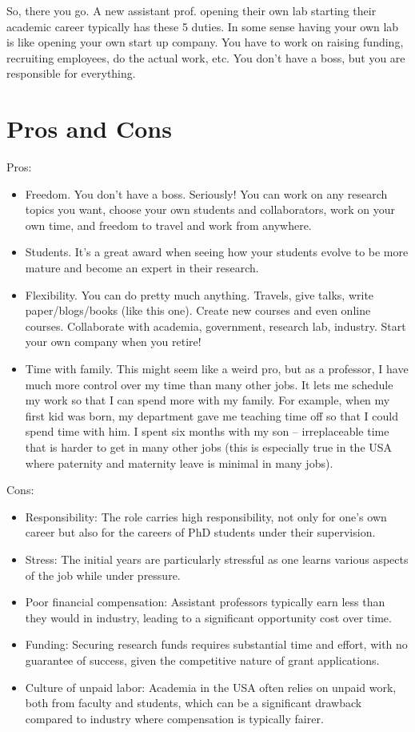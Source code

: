 \documentclass[oneside,11pt]{memoir}
\begin{document}
So, there you go. A new assistant prof. opening their own lab starting their academic career typically has these 5 duties.  In some sense having your own lab is like opening your own start up company. You have to work on raising funding, recruiting employees, do the actual work, etc.  You don't have a boss, but you are responsible for everything.  


\section{Pros and Cons}

Pros:
\begin{itemize}
\item Freedom. You don’t have a boss. Seriously! You can work on any research topics you want, choose your own students and collaborators, work on your own time, and freedom to travel and work from anywhere.

  \item Students. It's a great award when seeing how your students evolve to be more mature and become an expert in their research.

\item Flexibility. You can do pretty much anything.  Travels, give talks, write paper/blogs/books (like this one).  Create new courses and even online courses.  Collaborate  with academia, government, research lab, industry.  Start your own company when you retire!

\item Time with family. This might seem like a weird pro, but as a professor, I have much more
control over my time than many other jobs. It lets me schedule my work so that I can
spend more with my family. For example, when my ﬁrst kid was born, my department
gave me teaching time off so that I could spend time with him. I spent six months with
my son – irreplaceable time that is harder to get in many other jobs (this is especially
true in the USA where paternity and maternity leave is minimal in many jobs).
\end{itemize}

Cons:
\begin{itemize}
\item Responsibility: The role carries high responsibility, not only for one's own career but also for the careers of PhD students under their supervision.
\item Stress: The initial years are particularly stressful as one learns various aspects of the job while under pressure.
\item Poor financial compensation: Assistant professors typically earn less than they would in industry, leading to a significant opportunity cost over time.
\item Funding: Securing research funds requires substantial time and effort, with no guarantee of success, given the competitive nature of grant applications.
\item Culture of unpaid labor: Academia in the USA often relies on unpaid work, both from faculty and students, which can be a significant drawback compared to industry where compensation is typically fairer.
\end{itemize}
\end{document}
